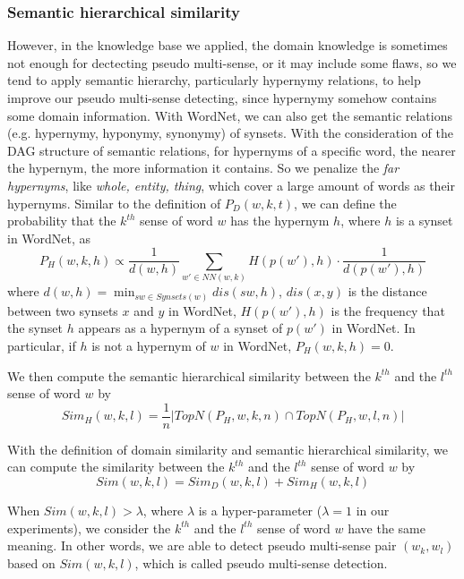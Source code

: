 \documentclass[11pt]{article}
\begin{document}
\subsubsection{Semantic hierarchical similarity}
\par
However, in the knowledge base we applied, the domain knowledge is sometimes not enough for dectecting pseudo multi-sense, or it may include some flaws, so we tend to apply semantic hierarchy, particularly hypernymy relations, to help improve our pseudo multi-sense detecting, since hypernymy somehow contains some domain information. With WordNet, we can also get the semantic relations (e.g. hypernymy, hyponymy, synonymy) of synsets. With the consideration of the DAG structure of semantic relations, for hypernyms of a specific word, the nearer the hypernym, the more information it contains. So we penalize the {\sl far hypernyms}, like {\sl whole, entity, thing}, which cover a large amount of words as their hypernyms. Similar to the definition of $P_D(w,k,t)$, we can define the probability that the $k^{th}$ sense of word $w$ has the hypernym $h$, where $h$ is a synset in WordNet, as
\begin{equation} \label{phyper}
P_H(w, k, h) \propto \frac{1}{d(w,h)} {\sum_{w' \in NN(w, k)} H(p(w'), h)} \cdot \frac{1}{d(p(w'),h)}
\end{equation}
where $d(w,h) = \min_{sw \in Synsets(w)} dis(sw, h)$, $dis(x, y)$ is the distance between two synsets $x$ and $y$ in WordNet, $H(p(w'), h)$ is the frequency that the synset $h$ appears as a hypernym of a synset of $p(w')$ in WordNet. In particular, if $h$ is not a hypernym of $w$ in WordNet, $P_H(w, k, h) = 0$.
\par
We then compute the semantic hierarchical similarity between the $k^{th}$ and the $l^{th}$ sense of word $w$ by
\begin{equation} \label{simh}
Sim_H(w,k,l) = \frac 1n|TopN(P_H,w,k,n) \cap TopN(P_H,w,l,n)| 
\end{equation}
\par
With the definition of domain similarity and semantic hierarchical similarity, we can compute the similarity between the $k^{th}$ and the $l^{th}$ sense of word $w$ by
\begin{equation} \label{simall}
Sim(w,k,l) = Sim_D(w,k,l) + Sim_H(w,k,l)
\end{equation}
\par
When $Sim(w,k,l) > \lambda$, where $\lambda$ is a hyper-parameter ($\lambda = 1$ in our experiments), we consider the $k^{th}$ and the $l^{th}$ sense of word $w$ have the same meaning. In other words, we are able to detect pseudo multi-sense pair $(w_k, w_l)$ based on $Sim(w, k, l)$, which is called pseudo multi-sense detection.
\end{document}
